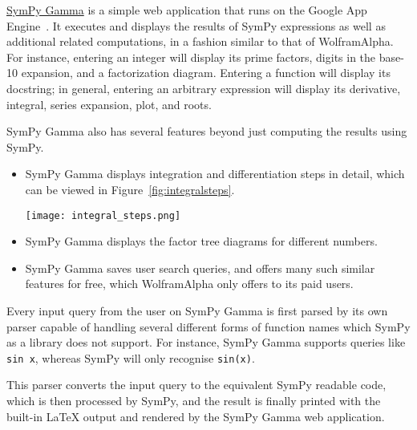 \href{http://sympygamma.com}{SymPy Gamma} is a simple web application that
runs on the Google App Engine~\cite{ciurana2009google}. It executes and
displays the results of SymPy expressions as well as additional related
computations, in a fashion similar to that of Wolfram\textbar{}Alpha. For
instance, entering an integer will display its prime factors, digits in the
base-10 expansion, and a factorization diagram. Entering a function will
display its docstring; in general, entering an arbitrary expression will
display its derivative, integral, series expansion, plot, and roots.

SymPy Gamma also has several features beyond just computing the
results using SymPy.

\begin{itemize}
\item
  SymPy Gamma displays integration and differentiation steps in detail, which
  can be viewed in Figure~\ref{fig:integralsteps}.\par
  {
    \centering
    \texttt{[image: integral\_steps.png]}
    \label{fig:integralsteps}
    \par
  }
\item
  SymPy Gamma displays the factor tree diagrams for different numbers.
\item
  SymPy Gamma saves user search queries, and offers many such similar features
  for free, which Wolfram\textbar{}Alpha only offers to its paid users.
\end{itemize}
Every input query from the user on SymPy Gamma is first parsed by its
own parser capable of handling several different forms of function names
which SymPy as a library does not support. For instance, SymPy Gamma
supports queries like \texttt{sin\ x}, whereas SymPy will only recognise
\verb|sin(x)|.

This parser converts the input query to the equivalent SymPy readable code,
which is then processed by SymPy, and the result is finally printed
with the built-in \LaTeX{} output and rendered by the SymPy Gamma web application.
